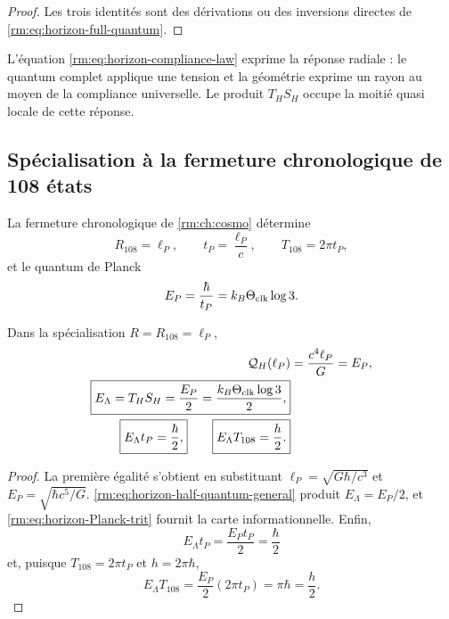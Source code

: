 \begin{proof}
Les trois identités sont des dérivations ou des inversions directes de \cref{rm:eq:horizon-full-quantum}.
\end{proof}

L’équation \cref{rm:eq:horizon-compliance-law} exprime la réponse radiale : le quantum complet applique une tension et la géométrie exprime un rayon au moyen de la compliance universelle. Le produit \(T_HS_H\) occupe la moitié quasi locale de cette réponse.

\subsection{Spécialisation à la fermeture chronologique de 108 états}

La fermeture chronologique de \cref{rm:ch:cosmo} détermine
\begin{equation}
 R_{108}=\ell_P,
 \qquad
 t_P=\frac{\ell_P}{c},
 \qquad
 T_{108}=2\pi t_P,
 \label{rm:eq:horizon-CT108-scales}
\end{equation}
et le quantum de Planck
\begin{equation}
 E_P=\frac{\hbar}{t_P}
 =k_B\Theta_{\rm clk}\log3.
 \label{rm:eq:horizon-Planck-trit}
\end{equation}

\begin{theorem}
\label{rm:thm:horizon-half-action}
Dans la spécialisation \(R=R_{108}=\ell_P\),
\begin{align}
 \mathcal Q_H(\ell_P)
 &=\frac{c^4\ell_P}{G}=E_P,
 \label{rm:eq:horizon-QH-EP}\\
 \boxed{
 E_\Lambda=T_HS_H
 =\frac{E_P}{2}
 =\frac{k_B\Theta_{\rm clk}\log3}{2},}
 \label{rm:eq:horizon-CT108-half-energy}\\
 \boxed{E_\Lambda t_P=\frac{\hbar}{2},}
 \qquad
 \boxed{E_\Lambda T_{108}=\frac h2.}
 \label{rm:eq:horizon-half-actions}
\end{align}
\end{theorem}

\begin{proof}
La première égalité s’obtient en substituant \(\ell_P=\sqrt{G\hbar/c^3}\) et \(E_P=\sqrt{\hbar c^5/G}\). \cref{rm:eq:horizon-half-quantum-general} produit \(E_\Lambda=E_P/2\), et \cref{rm:eq:horizon-Planck-trit} fournit la carte informationnelle. Enfin,
\[
 E_\Lambda t_P=\frac{E_Pt_P}{2}=\frac\hbar2
\]
et, puisque \(T_{108}=2\pi t_P\) et \(h=2\pi\hbar\),
\[
 E_\Lambda T_{108}
 =\frac{E_P}{2}(2\pi t_P)=\pi\hbar=\frac h2.
\]
\end{proof}

